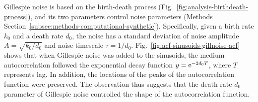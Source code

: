 Gillespie noise is based on the birth-death process (Fig.\ \ref{fig:analysis-birthdeath-process}), and its two parameters control noise parameters (Methods Section~\ref{subsec:methods-computational-synthetic}).
Specifically, given a birth rate $k_{0}$ and a death rate $d_{0}$, the noise has a standard deviation of noise amplitude $A = \sqrt{k_{0}/d_{0}}$ and noise timescale $\tau = 1/d_{0}$.
Fig.\ \ref{fig:acf-sinusoids-gillnoise-acf} shows that when Gillespie noise was added to the sinusoids, the medium autocorrelation followed the exponential decay function $y = \mathrm{e}^{-2d_{0}T}$, where $T$ represents lag.
In addition, the locations of the peaks of the autocorrelation function were preserved.
The observation thus suggests that the death rate $d_{0}$ parameter of Gillespie noise controlled the shape of the autocorrelation function.


